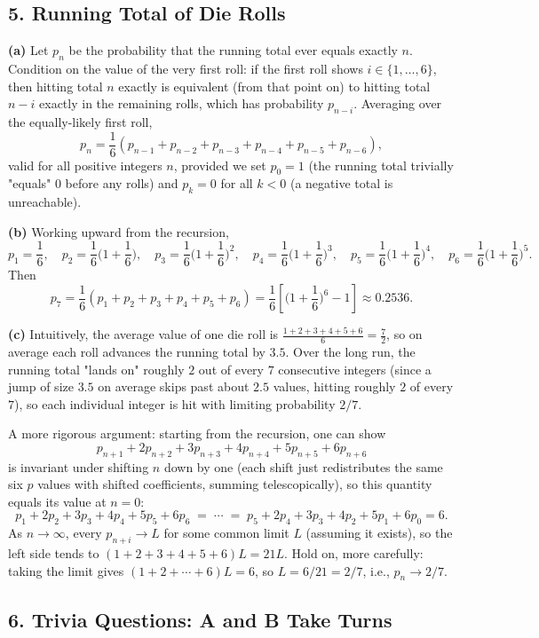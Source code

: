 \documentclass{article}
\begin{document}
\subsection*{5. Running Total of Die Rolls}

\textbf{(a)} Let $p_n$ be the probability that the running total ever equals exactly $n$. Condition on the value of the very first roll: if the first roll shows $i\in\{1,\dots,6\}$, then hitting total $n$ exactly is equivalent (from that point on) to hitting total $n-i$ exactly in the remaining rolls, which has probability $p_{n-i}$. Averaging over the equally-likely first roll,
$$
p_n = \frac{1}{6}(p_{n-1}+p_{n-2}+p_{n-3}+p_{n-4}+p_{n-5}+p_{n-6}),
$$
valid for all positive integers $n$, provided we set $p_0=1$ (the running total trivially "equals" $0$ before any rolls) and $p_k=0$ for all $k<0$ (a negative total is unreachable).

\medskip
\textbf{(b)} Working upward from the recursion,
$$
p_1=\frac{1}{6},\quad p_2=\frac{1}{6}\Big(1+\frac16\Big),\quad p_3=\frac{1}{6}\Big(1+\frac16\Big)^2,\quad p_4=\frac{1}{6}\Big(1+\frac16\Big)^3,\quad p_5=\frac{1}{6}\Big(1+\frac16\Big)^4,\quad p_6=\frac{1}{6}\Big(1+\frac16\Big)^5.
$$
Then
$$
p_7=\frac{1}{6}(p_1+p_2+p_3+p_4+p_5+p_6)=\frac{1}{6}\left[\Big(1+\frac16\Big)^6-1\right]\approx 0.2536.
$$

\medskip
\textbf{(c)} Intuitively, the average value of one die roll is $\frac{1+2+3+4+5+6}{6}=\frac{7}{2}$, so on average each roll advances the running total by $3.5$. Over the long run, the running total "lands on" roughly $2$ out of every $7$ consecutive integers (since a jump of size $3.5$ on average skips past about $2.5$ values, hitting roughly $2$ of every $7$), so each individual integer is hit with limiting probability $2/7$.

A more rigorous argument: starting from the recursion, one can show
$$
p_{n+1}+2p_{n+2}+3p_{n+3}+4p_{n+4}+5p_{n+5}+6p_{n+6}
$$
is invariant under shifting $n$ down by one (each shift just redistributes the same six $p$ values with shifted coefficients, summing telescopically), so this quantity equals its value at $n=0$:
$$
p_1+2p_2+3p_3+4p_4+5p_5+6p_6 \;=\; \cdots \;=\; p_5+2p_4+3p_3+4p_2+5p_1+6p_0 = 6.
$$
As $n\to\infty$, every $p_{n+i}\to L$ for some common limit $L$ (assuming it exists), so the left side tends to $(1+2+3+4+5+6)L=21L$. Hold on, more carefully: taking the limit gives $(1+2+\cdots+6)L = 6$, so $L=6/21=2/7$, i.e., $p_n\to 2/7$.

\subsection*{6. Trivia Questions: A and B Take Turns}
\end{document}
